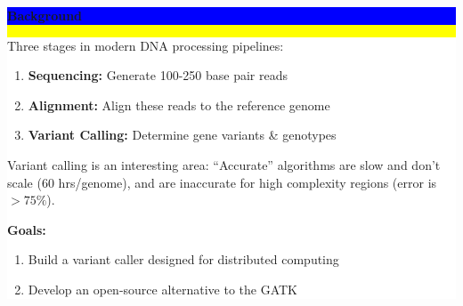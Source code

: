 \documentclass[11pt]{a0poster}
\begin{document}
\noindent\colorbox{Yellow}{
\begin{minipage}[t][2045pt][t]{\linewidth}

\noindent\begin{minipage}{0.025\linewidth}
\hfill
\pagebreak
\end{minipage}
\begin{minipage}{0.3\linewidth}
\vspace{75pt}
\colorbox{Blue}{
\begin{minipage}{\linewidth}
\vspace{25pt}
\begin{center}
\Huge \bf \color{White} Background
\end{center}
\vspace{10pt}
\end{minipage}
}
\colorbox{White}{
\begin{minipage}[t][600pt][t]{\linewidth}
\color{Blue}
\vspace{20pt}
\LARGE Three stages in modern DNA processing pipelines:
\begin{enumerate}
\item {\bf Sequencing:} Generate 100-250 base pair reads
\item {\bf Alignment:} Align these reads to the reference genome
\item {\bf Variant Calling:} Determine gene variants \& genotypes
\end{enumerate}
Variant calling is an interesting area: ``Accurate'' algorithms are slow and don't
scale (60 hrs/genome), and are inaccurate for high complexity regions (error is $>75\%$).

\textbf{Goals:}
\begin{enumerate}
\item Build a variant caller designed for distributed computing
\item Develop an open-source alternative to the GATK
\end{enumerate}
\hfill
\pagebreak
\end{minipage}
}


\end{minipage}
\end{minipage}}
\end{document}
